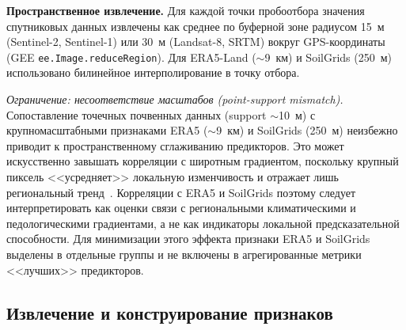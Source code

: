 \textbf{Пространственное извлечение.} Для каждой точки пробоотбора значения спутниковых данных извлечены как среднее по буферной зоне радиусом 15~м (Sentinel-2, Sentinel-1) или 30~м (Landsat-8, SRTM) вокруг GPS-координаты (GEE \texttt{ee.Image.reduceRegion}). Для ERA5-Land ($\sim$9~км) и SoilGrids (250~м) использовано билинейное интерполирование в точку отбора.

\textit{Ограничение: несоответствие масштабов (point-support mismatch).} Сопоставление точечных почвенных данных (support $\sim$10~м) с крупномасштабными признаками ERA5 ($\sim$9~км) и SoilGrids (250~м) неизбежно приводит к пространственному сглаживанию предикторов. Это может искусственно завышать корреляции с широтным градиентом, поскольку крупный пиксель <<усредняет>> локальную изменчивость и отражает лишь региональный тренд~\citep{Wadoux2020}. Корреляции с ERA5 и SoilGrids поэтому следует интерпретировать как оценки связи с региональными климатическими и педологическими градиентами, а не как индикаторы локальной предсказательной способности. Для минимизации этого эффекта признаки ERA5 и SoilGrids выделены в отдельные группы и не включены в агрегированные метрики <<лучших>> предикторов.

\subsection{Извлечение и конструирование признаков}
\label{sec:feature_pipeline}


